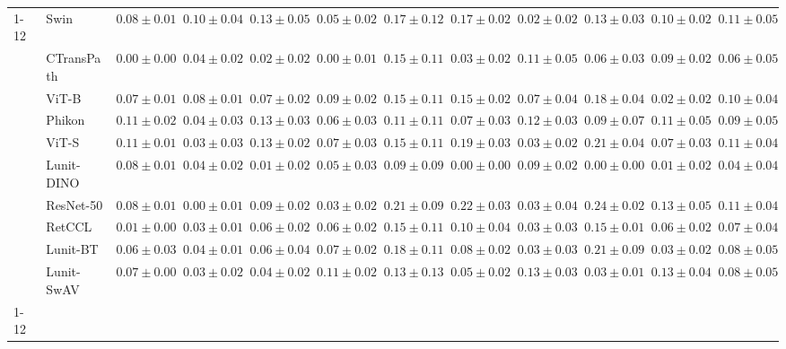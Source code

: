 \begin{tabular}{ll|cccc|c|cccc|c}
\cline{1-12}
\multirow[t]{10}{*}{Mean pool} & Swin & $0.08 \pm 0.01$ & $0.10 \pm 0.04$ & $0.13 \pm 0.05$ & $0.05 \pm 0.02$ & $0.17 \pm 0.12$ & $0.17 \pm 0.02$ & $\mathbf{0.02 \pm 0.02}$ & $0.13 \pm 0.03$ & $0.10 \pm 0.02$ & $0.11 \pm 0.05$ \\
 & CTransPath & $\mathbf{0.00 \pm 0.00}$ & $0.04 \pm 0.02$ & $0.02 \pm 0.02$ & $\mathbf{0.00 \pm 0.01}$ & $0.15 \pm 0.11$ & $0.03 \pm 0.02$ & $0.11 \pm 0.05$ & $0.06 \pm 0.03$ & $0.09 \pm 0.02$ & $0.06 \pm 0.05$ \\
 & ViT-B & $0.07 \pm 0.01$ & $0.08 \pm 0.01$ & $0.07 \pm 0.02$ & $0.09 \pm 0.02$ & $0.15 \pm 0.11$ & $0.15 \pm 0.02$ & $0.07 \pm 0.04$ & $0.18 \pm 0.04$ & $0.02 \pm 0.02$ & $0.10 \pm 0.04$ \\
 & Phikon & $0.11 \pm 0.02$ & $0.04 \pm 0.03$ & $0.13 \pm 0.03$ & $0.06 \pm 0.03$ & $0.11 \pm 0.11$ & $0.07 \pm 0.03$ & $0.12 \pm 0.03$ & $0.09 \pm 0.07$ & $0.11 \pm 0.05$ & $0.09 \pm 0.05$ \\
 & ViT-S & $0.11 \pm 0.01$ & $0.03 \pm 0.03$ & $0.13 \pm 0.02$ & $0.07 \pm 0.03$ & $0.15 \pm 0.11$ & $0.19 \pm 0.03$ & $0.03 \pm 0.02$ & $0.21 \pm 0.04$ & $0.07 \pm 0.03$ & $0.11 \pm 0.04$ \\
 & Lunit-DINO & $0.08 \pm 0.01$ & $0.04 \pm 0.02$ & $\mathbf{0.01 \pm 0.02}$ & $0.05 \pm 0.03$ & $\mathbf{0.09 \pm 0.09}$ & $\mathbf{0.00 \pm 0.00}$ & $0.09 \pm 0.02$ & $\mathbf{0.00 \pm 0.00}$ & $\mathbf{0.01 \pm 0.02}$ & $\mathbf{0.04 \pm 0.04}$ \\
 & ResNet-50 & $0.08 \pm 0.01$ & $\mathbf{0.00 \pm 0.01}$ & $0.09 \pm 0.02$ & $0.03 \pm 0.02$ & $0.21 \pm 0.09$ & $0.22 \pm 0.03$ & $0.03 \pm 0.04$ & $0.24 \pm 0.02$ & $0.13 \pm 0.05$ & $0.11 \pm 0.04$ \\
 & RetCCL & $0.01 \pm 0.00$ & $0.03 \pm 0.01$ & $0.06 \pm 0.02$ & $0.06 \pm 0.02$ & $0.15 \pm 0.11$ & $0.10 \pm 0.04$ & $0.03 \pm 0.03$ & $0.15 \pm 0.01$ & $0.06 \pm 0.02$ & $0.07 \pm 0.04$ \\
 & Lunit-BT & $0.06 \pm 0.03$ & $0.04 \pm 0.01$ & $0.06 \pm 0.04$ & $0.07 \pm 0.02$ & $0.18 \pm 0.11$ & $0.08 \pm 0.02$ & $0.03 \pm 0.03$ & $0.21 \pm 0.09$ & $0.03 \pm 0.02$ & $0.08 \pm 0.05$ \\
 & Lunit-SwAV & $0.07 \pm 0.00$ & $0.03 \pm 0.02$ & $0.04 \pm 0.02$ & $0.11 \pm 0.02$ & $0.13 \pm 0.13$ & $0.05 \pm 0.02$ & $0.13 \pm 0.03$ & $0.03 \pm 0.01$ & $0.13 \pm 0.04$ & $0.08 \pm 0.05$ \\
\cline{1-12}
\bottomrule
\end{tabular}
